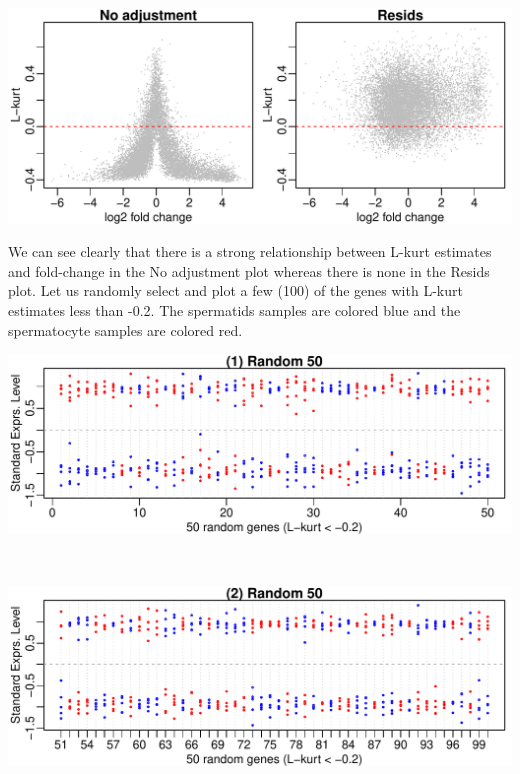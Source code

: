 \documentclass[a4paper, 10pt]{article}\usepackage[]{graphicx}\usepackage[]{color}
\makeatletter
\def\maxwidth{ %
  \ifdim\Gin@nat@width>\linewidth
    \linewidth
  \else
    \Gin@nat@width
  \fi
}
\newenvironment{knitrout}{}{} %
\makeatother
\begin{document}
\begin{knitrout}\small
{}\color{fgcolor}

{\centering \includegraphics[width=\maxwidth]{figure/Hammoud2-1} 

}



\end{knitrout}

\noindent We can see clearly that there is a strong
relationship between L-kurt estimates and fold-change
in the No adjustment plot whereas there is none in
the Resids plot. 
Let us randomly select and plot a few (100) of the genes with
L-kurt estimates less than -0.2.
The spermatids samples are colored blue and 
the spermatocyte samples are colored red.

\begin{knitrout}\small
{}\color{fgcolor}

{\centering \includegraphics[width=\maxwidth]{figure/Hammoud3-1} 

}



\end{knitrout}
${}_{}$
\begin{knitrout}\small
{}\color{fgcolor}

{\centering \includegraphics[width=\maxwidth]{figure/Hammoud4-1} 

}



\end{knitrout}
\end{document}

